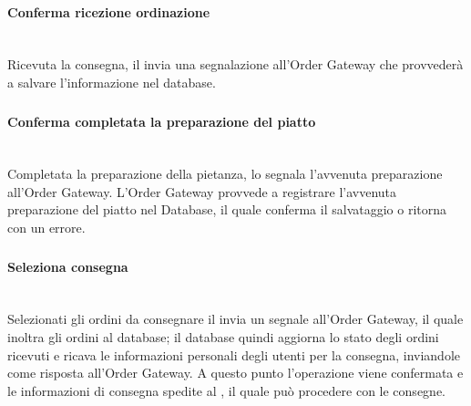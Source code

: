 \paragraph{Conferma ricezione ordinazione}\mbox{}\\
Ricevuta la consegna, il \Customer{} invia una segnalazione all'Order Gateway che provvederà a salvare l'informazione nel database.

\subsubsection{\Chef{}}

\paragraph{Conferma completata la preparazione del piatto}\mbox{}\\
Completata la preparazione della pietanza, lo \Chef{} segnala l'avvenuta preparazione all'Order Gateway. L'Order Gateway provvede a registrare l'avvenuta preparazione del piatto nel Database, il quale conferma il salvataggio o ritorna con un errore.

\subsubsection{\Deliveryman{}}

\paragraph{Seleziona consegna}\mbox{}\\
Selezionati gli ordini da consegnare il \Deliveryman{} invia un segnale all'Order Gateway, il quale inoltra gli ordini al database; il database quindi aggiorna lo stato degli ordini ricevuti e ricava le informazioni personali degli utenti per la consegna, inviandole come risposta all'Order Gateway. A questo punto l'operazione viene confermata e le informazioni di consegna spedite al \Deliveryman{}, il quale può procedere con le consegne.

